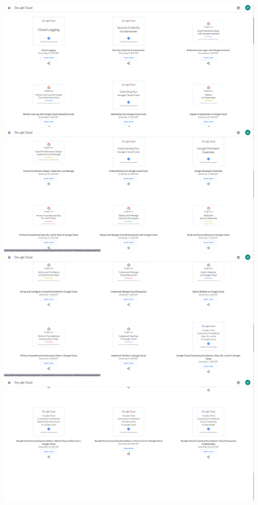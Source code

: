 \begin{landscape}
	\includegraphics[scale=0.4]{./assets/gcsb1}\\
	\includegraphics[scale=0.4]{./assets/gcsb2}\\
	\includegraphics[scale=0.4]{./assets/gcsb3}\\
	\includegraphics[scale=0.4]{./assets/gcsb4}\\
\end{landscape}
